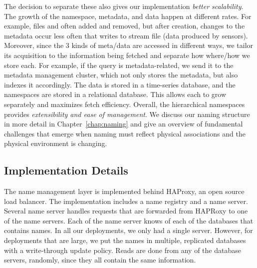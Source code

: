 The decision to separate these also gives our implementation \emph{better scalability}.  The growth of the namespace, metadata, and data
happen at different rates.  For example, files and often added and removed, but after creation, changes to the metadata occur less
often that writes to stream file (data produced by sensors).  Moreover, since the 3 kinds of meta/data are accessed in different ways,
we tailor its acquisition to the information being fetched and separate how where/how we store each. %
For example, if the query is metadata-related, we send it to the metadata management cluster, which not only stores
the metadata, but also indexes it accordingly.  The data is stored in a time-series database, and the namespaces are stored in a relational
database.  This allows each to grow separately and maximizes fetch efficiency.  Overall, the hierarchical namespaces provides 
\emph{extensibility and ease of management}.
We discuss our naming structure in more detail in Chapter~\ref{chap:naming} and give an overview of fundamental challenges that emerge when
naming must reflect physical associations and the physical environment is changing.

\subsection{Implementation Details}

The name management layer is implemented behind HAProxy, an open source load balancer. The implementation includes 
a name registry and a name server.  Several name server handles requests that are forwarded
from HAPRoxy to one of the name servers.  Each of the name server knows of each of the databases that contains names. 
In all our deployments, we only had a single server.  However, for deployments that are large, we put the names in multiple, 
replicated databases with a write-through update policy.  Reads are done from any of the database servers, randomly, since
they all contain the same information.  %

